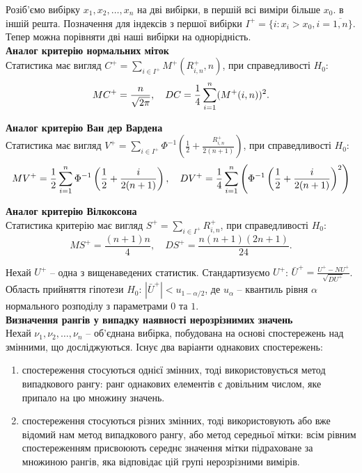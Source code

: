 Розіб'ємо вибірку $x_1, x_2, \ldots, x_n$ на дві вибірки, в першій всі виміри більше $x_0$. в іншій решта. Позначення для індексів з першої вибірки $I^+ = \{ i : x_i > x_0, i = \overline{1,n} \}$. Тепер можна порівняти дві наші вибірки на однорідність. \\

\textbf{Аналог критерію нормальних міток} \\

Статистика має вигляд $C^+ = \sum_{i \in I^+} M^+(R_{i,n}^+, n)$, при справедливості $H_0$: \[ MC^+ = \dfrac{n}{\sqrt{2\pi}}, \quad DC = \dfrac{1}{4} \displaystyle\sum\limits_{i=1}^n (M^+(i, n))^2. \]

\textbf{Аналог критерію Ван дер Вардена} \\

Статистика має вигляд $V^+ = \sum_{i \in I^+} \Phi^{-1} \left( \frac{1}{2} + \frac{R_{i,n}^+}{2(n + 1)} \right)$, при справедливості $H_0$: \[ MV^+ = \dfrac{1}{2} \displaystyle\sum\limits_{i=1}^n \Phi^{-1} \left( \dfrac{1}{2} + \dfrac{i}{2(n + 1)} \right), \quad DV^+ = \dfrac{1}{4} \displaystyle\sum\limits_{i=1}^n \left( \Phi^{-1} \left( \dfrac{1}{2} + \dfrac{i}{2(n + 1)} \right)^2 \right) \]

\textbf{Аналог критерію Вілкоксона} \\

Статистика критерію має вигляд  $S^+ = \sum_{i\in I^+} R_{i, n}^+$, при справедливості $H_0$: \[ MS^+ = \dfrac{(n+1)n}{4}, \quad DS^+ = \dfrac{n(n+1)(2n+1)}{24}. \]

Нехай $U^+$ -- одна з вищенаведених статистик. Стандартизуємо $U^+$: $\bar{U}^+ = \frac{U^+ - NU^+}{\sqrt{DU^+}}$. Область прийняття гіпотези $H_0$: $|\bar{U}^+| < u_{1 - \alpha / 2}$, де $u_\alpha$ -- квантиль рівня $\alpha$ нормального розподілу з параметрами $0$ та $1$. \\

\textbf{Визначення рангів у випадку наявності нерозрізнимих значень} \\

Нехай $\nu_1, \nu_2, \ldots, \nu_n$ -- об'єднана вибірка, побудована на основі спостережень над змінними, що досліджуються. Існує два варіанти однакових спостережень:
\begin{enumerate}
    \item спостереження стосуються однієї змінних, тоді використовується метод випадкового рангу: ранг однакових елементів є довільним числом, яке припало на цю множину значень.
    
    \item спостереження стосуються різних змінних, тоді використовують або вже відомий нам метод випадкового рангу, або метод середньої мітки: всім рівним спостереженням присвоюють середнє значення мітки підраховане за множиною рангів, яка відповідає цій групі нерозрізними вимірів.
\end{enumerate}

